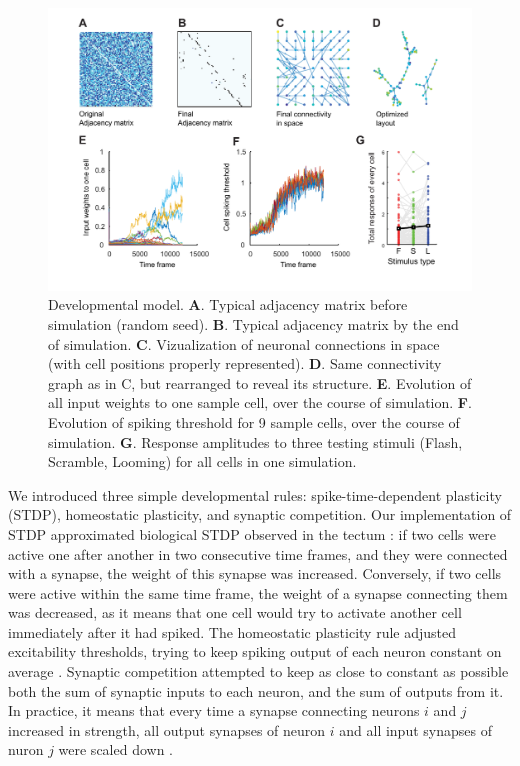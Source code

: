 \documentclass{article}
\begin{document}
\begin{figure}[!t]
\includegraphics[width=\linewidth]{fig7.pdf}
\caption{
Developmental model. \textbf{A}. Typical adjacency matrix before simulation (random seed). \textbf{B}. Typical adjacency matrix by the end of simulation. \textbf{C}. Vizualization of neuronal connections in space (with cell positions properly represented). \textbf{D}. Same connectivity graph as in C, but rearranged to reveal its structure. \textbf{E}. Evolution of all input weights to one sample cell, over the course of simulation. \textbf{F}. Evolution of spiking threshold for 9 sample cells, over the course of simulation. \textbf{G}. Response amplitudes to three testing stimuli (Flash, Scramble, Looming) for all cells in one simulation. }
\end{figure}

We introduced three simple developmental rules: spike-time-dependent plasticity (STDP), homeostatic plasticity, and synaptic competition. Our implementation of STDP approximated biological STDP observed in the tectum \citep{zhang1998stdp,mu2006stdp}: if two cells were active one after another in two consecutive time frames, and they were connected with a synapse, the weight of this synapse was increased. Conversely, if two cells were active within the same time frame, the weight of a synapse connecting them was decreased, as it means that one cell would try to activate another cell immediately after it had spiked. The homeostatic plasticity rule adjusted excitability thresholds, trying to keep spiking output of each neuron constant on average \citep{pratt2007intrinsic,turrigiano2011}. Synaptic competition attempted to keep as close to constant as possible both the sum of synaptic inputs to each neuron, and the sum of outputs from it. In practice, it means that every time a synapse connecting neurons $i$ and $j$ increased in strength, all output synapses of neuron $i$ and all input synapses of nuron $j$ were scaled down \citep{hamodi2016nmda,cohen2002synreview,munz2014hebbian}.
\end{document}
